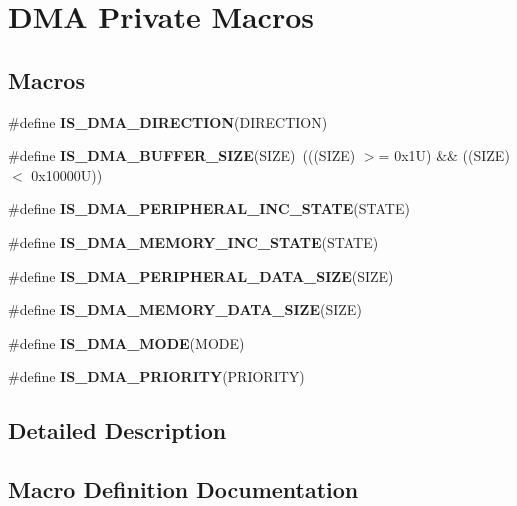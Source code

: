 \hypertarget{group___d_m_a___private___macros}{}\section{D\+MA Private Macros}
\label{group___d_m_a___private___macros}
\subsection*{Macros}
\begin{DoxyCompactItemize}
\item 
\#define {\bfseries I\+S\+\_\+\+D\+M\+A\+\_\+\+D\+I\+R\+E\+C\+T\+I\+ON}(D\+I\+R\+E\+C\+T\+I\+ON)
\item 
\mbox{\label{group___d_m_a___private___macros_ga72ef4033bb3bc2cdfdbe579083b05e32}} 
\#define {\bfseries I\+S\+\_\+\+D\+M\+A\+\_\+\+B\+U\+F\+F\+E\+R\+\_\+\+S\+I\+ZE}(S\+I\+ZE)~(((S\+I\+ZE) $>$= 0x1\+U) \&\& ((\+S\+I\+Z\+E) $<$ 0x10000\+U))
\item 
\#define {\bfseries I\+S\+\_\+\+D\+M\+A\+\_\+\+P\+E\+R\+I\+P\+H\+E\+R\+A\+L\+\_\+\+I\+N\+C\+\_\+\+S\+T\+A\+TE}(S\+T\+A\+TE)
\item 
\#define {\bfseries I\+S\+\_\+\+D\+M\+A\+\_\+\+M\+E\+M\+O\+R\+Y\+\_\+\+I\+N\+C\+\_\+\+S\+T\+A\+TE}(S\+T\+A\+TE)
\item 
\#define {\bfseries I\+S\+\_\+\+D\+M\+A\+\_\+\+P\+E\+R\+I\+P\+H\+E\+R\+A\+L\+\_\+\+D\+A\+T\+A\+\_\+\+S\+I\+ZE}(S\+I\+ZE)
\item 
\#define {\bfseries I\+S\+\_\+\+D\+M\+A\+\_\+\+M\+E\+M\+O\+R\+Y\+\_\+\+D\+A\+T\+A\+\_\+\+S\+I\+ZE}(S\+I\+ZE)
\item 
\#define {\bfseries I\+S\+\_\+\+D\+M\+A\+\_\+\+M\+O\+DE}(M\+O\+DE)
\item 
\#define {\bfseries I\+S\+\_\+\+D\+M\+A\+\_\+\+P\+R\+I\+O\+R\+I\+TY}(P\+R\+I\+O\+R\+I\+TY)
\end{DoxyCompactItemize}


\subsection{Detailed Description}


\subsection{Macro Definition Documentation}
\mbox{\label{group___d_m_a___private___macros_gae2b02e8e823854bcd7c5746cdd29e70d}} 
